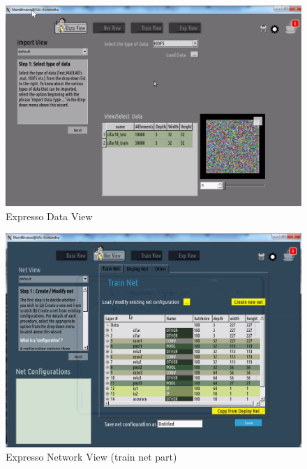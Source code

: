 \begin{figure}[!ht]
\center
    \includegraphics[scale=0.9]{images_expresso/01_data.png}
    \caption{Expresso Data View}
\end{figure}

\begin{figure}[!ht]
\center
    \includegraphics[scale=0.9]{images_expresso/02_net_train_net.png}
    \caption{Expresso Network View (train net part)}
\end{figure}

